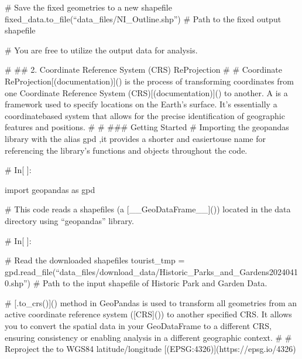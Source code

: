 \documentclass[letterpaper,10pt,english]{sphinxmanual}
\begin{document}
\sphinxAtStartPar
\# Save the fixed geometries to a new shapefile
fixed\_data.to\_file(“data\_files/NI\_Outline.shp”) \# Path to the fixed output shapefile

\sphinxAtStartPar
\# You are free to utilize the output data for analysis.

\sphinxAtStartPar
\# \#\# 2. Coordinate Reference System (CRS) Re\sphinxhyphen{}Projection
\#
\# Coordinate Re\sphinxhyphen{}Projection{[}(documentation){]}() is the process of transforming coordinates from one Coordinate Reference System (CRS){[}(documentation){]}() to another. A  is a framework used to specify locations on the Earth’s surface. It’s essentially a coordinate\sphinxhyphen{}based system that allows for the precise identification of geographic features and positions.
\#
\# \#\#\# Getting Started
\# Importing the geopandas library with the alias gpd ,it provides a shorter and easier\sphinxhyphen{}to\sphinxhyphen{}use name for referencing the library’s functions and objects throughout the code.

\sphinxAtStartPar
\# In{[} {]}:

\sphinxAtStartPar
import geopandas as gpd

\sphinxAtStartPar
\# This code reads a shapefiles (a {[}\_\_GeoDataFrame\_\_{]}()) located in the data directory using “geopandas” library.

\sphinxAtStartPar
\# In{[} {]}:

\sphinxAtStartPar
\# Read the downloaded shapefiles
tourist\_tmp = gpd.read\_file(“data\_files/download\_data/Historic\_Parks\_and\_Gardens20240410.shp”)  \# Path to the input shapefile of Historic Park and Garden Data.

\sphinxAtStartPar
\# {[}.to\_crs(){]}() method in GeoPandas is used to transform all geometries from an active coordinate reference system ({[}CRS{]}()) to another specified CRS. It allows you to convert the spatial data in your GeoDataFrame to a different CRS, ensuring consistency or enabling analysis in a different geographic context.
\#
\# Re\sphinxhyphen{}project the  to WGS84 latitude/longitude {[}(EPSG:4326){]}(https://epsg.io/4326)
\end{document}
